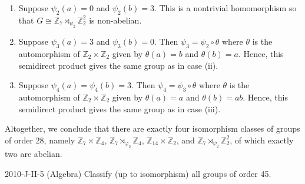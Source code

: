 \documentclass{article}
\begin{document}
\begin{solutions}
\begin{enumerate}[itemsep =-2pt,label = (\Roman{*})]
\begin{enumerate}[itemsep =-2pt,label = (\roman{*})]
					\item Suppose $\psi_{2}(a) = 0$ and $\psi_{2}(b) = 3$. This is a nontrivial homomorphism so that $G \cong \mathbb{Z}_{7} \rtimes_{\psi_{2}}\mathbb{Z}_{2}^{2}$ is non-abelian. 
					\item Suppose $\psi_{3}(a) = 3$ and $\psi_{3}(b) = 0$. Then $\psi_{3} = \psi_{2} \circ \theta$ where $\theta$ is the automorphism of $\mathbb{Z}_{2} \times \mathbb{Z}_{2}$ given by $\theta(a) = b$ and $\theta(b) = a$. Hence, this semidirect product gives the same group as in case (ii). 
					\item Suppose $\psi_{4}(a) = \psi_{4}(b) = 3$. Then $\psi_{4} = \psi_{3} \circ \theta$ where $\theta$ is the automorphism of $\mathbb{Z}_{2} \times \mathbb{Z}_{2}$ given by $\theta(a) = a$ and $\theta(b) = ab$. Hence, this semidirect product gives the same group as in case (iii). 
				\end{enumerate}
		\end{enumerate}
	Altogether, we conclude that there are exactly four isomorphism classes of groups of order 28, namely $\mathbb{Z}_{7} \times \mathbb{Z}_{4}$, $\mathbb{Z}_{7} \rtimes_{\varphi_{2}}\mathbb{Z}_{4}$, $\mathbb{Z}_{14} \times \mathbb{Z}_{2}$, and $\mathbb{Z}_{7} \rtimes_{\psi_{2}}\mathbb{Z}_{2}^{2}$, of which exactly two are abelian. 
\end{solutions}
\begin{prb}{2010-J-II-5 (Algebra)}
	Classify (up to isomorphism) all groups of order 45. 
\end{prb}
\end{document}
